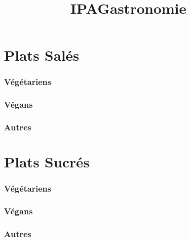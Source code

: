 \documentclass[a4paper,12pt]{report}
\begin{document}
\title{\textbf{IPAGastronomie}}
\date{}  %

\maketitle  %

\renewcommand{\thesection}{\arabic{section}}  %

\tableofcontents  %
\newpage


\part{Plats Salés}
\setcounter{section}{0}

\section{Végétariens}
\newpage


\section{Végans}
\newpage


\section{Autres}
\newpage



\part{Plats Sucrés}
\setcounter{section}{0}

\section{Végétariens}
\newpage


\section{Végans}
\newpage


\section{Autres}
\newpage
\end{document}
